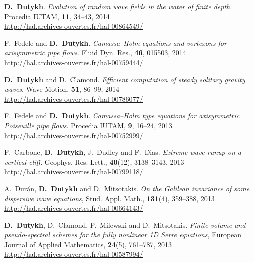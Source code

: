 \begin{etaremune}
  \item \textbf{D.~Dutykh}. \textit{Evolution of random wave fields in the water of finite depth}. Procedia IUTAM, \textbf{11}, 34--43, 2014 \\ %
  \url{http://hal.archives-ouvertes.fr/hal-00864549/}
  
  \item F.~Fedele and \textbf{D.~Dutykh}. \textit{Camassa--Holm equations and vortexons for axisymmetric pipe flows}. Fluid Dyn. Res., \textbf{46}, 015503, 2014 \\ %
  \url{http://hal.archives-ouvertes.fr/hal-00759444/}

  \item \textbf{D.~Dutykh} and D.~Clamond. \textit{Efficient computation of steady solitary gravity waves}. Wave Motion, \textbf{51}, 86--99, 2014 \\ %
  \url{http://hal.archives-ouvertes.fr/hal-00786077/}


  \item F.~Fedele and \textbf{D.~Dutykh}. \textit{Camassa--Holm type equations for axisymmetric Poiseuille pipe flows}. Procedia IUTAM, \textbf{9}, 16--24, 2013 \\ %
  \url{http://hal.archives-ouvertes.fr/hal-00752999/}

  \item F.~Carbone, \textbf{D.~Dutykh}, J.~Dudley and F.~Dias. \textit{Extreme wave runup on a vertical cliff}. Geophys. Res. Lett., \textbf{40}(12), 3138--3143, 2013 \\ %
  \url{http://hal.archives-ouvertes.fr/hal-00799118/}

  \item A.~Dur\'an, \textbf{D.~Dutykh} and D.~Mitsotakis. \textit{On the Galilean invariance of some dispersive wave equations}, Stud. Appl. Math., \textbf{131}(4), 359--388, 2013 \\ %
  \url{http://hal.archives-ouvertes.fr/hal-00664143/}

  \item \textbf{D.~Dutykh}, D.~Clamond, P.~Milewski and D.~Mitsotakis. \textit{Finite volume and pseudo-spectral schemes for the fully nonlinear 1D Serre equations}, European Journal of Applied Mathematics, \textbf{24}(5), 761--787, 2013 \\ %
  \url{http://hal.archives-ouvertes.fr/hal-00587994/}
  

\end{etaremune}
